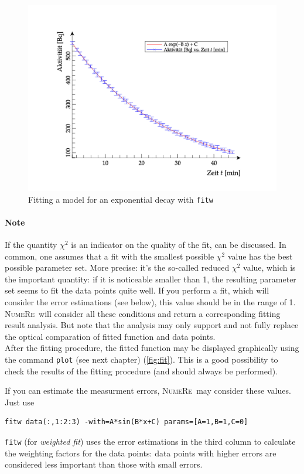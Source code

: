 \documentclass[DIV=14,headsepline,footsepline]{scrbook}
\newcommand{\NR}{\textsc{Nu\-me\-Re}}
\begin{document}
				\begin{figure}[htb]%
					\centering
					\includegraphics[width=\textwidth]{_graphics/plot.png}
					\caption{Fitting a model for an exponential decay with \texttt{fitw}}
					\label{fig:fit}
				\end{figure}
				
				\paragraph{Note}
					If the quantity $\chi^2$ is an indicator on the quality of the fit, can be discussed. In common, one assumes that a fit with the smallest possible $\chi^2$ value has the best possible parameter set. More precise: it's the so-called reduced $\chi^2$ value, which is the important quantity: if it is noticeable smaller than 1, the resulting parameter set seems to fit the data points quite well. If you perform a fit, which will consider the error estimations (see below), this value should be in the range of 1. \NR\ will consider all these conditions and return a corresponding fitting result analysis. But note that the analysis may only support and not fully replace the optical comparation of fitted function and data points.\bigskip\\
				After the fitting procedure, the fitted function may be displayed graphically using the command \verb+plot+ (see next chapter) (\autoref{fig:fit}). This is a good possibility to check the results of the fitting procedure (and should always be performed).
				
				If you can estimate the measurment errors, \NR\ may consider these values. Just use
				\begin{lstlisting}
fitw data(:,1:2:3) -with=A*sin(B*x+C) params=[A=1,B=1,C=0]
				\end{lstlisting}
				\verb+fitw+ (for \emph{weighted fit}) uses the error estimations in the third column to calculate the weighting factors for the data points: data points with higher errors are considered less important than those with small errors.
				
\end{document}

